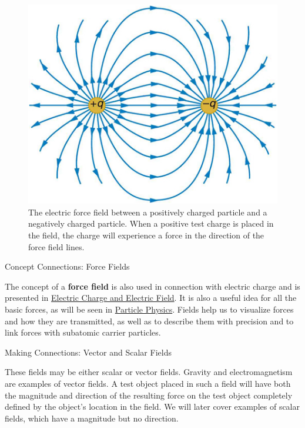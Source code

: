 \documentclass[
]{book}
\newenvironment{note}{}{}
\begin{document}
\begin{figure}
\hypertarget{import-auto-id1577565}{%
\centering
\includegraphics{images/Figure_04_08_01.jpg}
\caption{The electric force field between a positively charged particle and a
negatively charged particle. When a positive test charge is placed in
the field, the charge will experience a force in the direction of the
force field lines.}\label{import-auto-id1577565}
}
\end{figure}

\hypertarget{fs-id2639325}{}
\begin{note}

Concept Connections: Force Fields

The concept of a \textbf{force field} is also used in connection with
electric charge and is presented in \href{/m55297}{Electric Charge and Electric
Field}. It is also a useful idea for all the basic forces, as
will be seen in \href{/m54854}{Particle Physics}. Fields help us to visualize
forces and how they are transmitted, as well as to describe them with
precision and to link forces with subatomic carrier particles.

\end{note}

\hypertarget{fs-id1421634}{}
\begin{note}

\leavevmode\hypertarget{fs-id1399053}{}%
Making Connections: Vector and Scalar Fields

These fields may be either scalar or vector fields. Gravity and
electromagnetism are examples of vector fields. A test object placed in
such a field will have both the magnitude and direction of the resulting
force on the test object completely defined by the object's location in
the field. We will later cover examples of scalar fields, which have a
magnitude but no direction.

\end{note}
\end{document}

